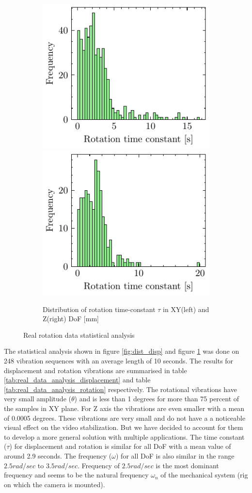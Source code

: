 \begin{figure}[H]
    \begin{subfigure}{\linewidth}
    \includegraphics[width=.5\linewidth]{images/fig_chapter4/data_dist/11.pdf}\hfill
    \includegraphics[width=.5\linewidth]{images/fig_chapter4/data_dist/12.pdf}
    \caption{Distribution of rotation time-constant $ \tau $ in XY(left) and Z(right) DoF [mm]}
    \end{subfigure}

\caption{Real rotation data statistical analysis}
\label{fig:dist_rot}
\end{figure}


The statistical analysis shown in figure \ref{fig:dist_disp} and figure \ref{fig:dist_rot} was done on 248 vibration sequences with an average length of 10 seconds. The results for displacement and rotation vibrations are summarised in table \ref{tab:real_data_analysis_displacement} and table \ref{tab:real_data_analysis_rotation} respectively. The rotational vibrations have very small amplitude ($ \theta $) and is less than 1 degrees for more than 75 percent of the samples in XY plane. For Z axis the vibrations are even smaller with a mean of 0.0005 degrees. These vibrations are very small and do not have a a noticeable visual effect on the video stabilization. But we have decided to account for them to develop a more general solution with multiple applications. The time constant ($ \tau $) for displacement and rotation is similar for all DoF with a mean value of around 2.9 seconds.  The frequency ($ \omega $) for all DoF is also similar in the range $ 2.5 rad/sec $ to $ 3.5 rad/sec $. Frequency of $ 2.5 rad/sec $ is the most dominant frequency and seems to be the natural frequency $ \omega_n $ of the mechanical system (rig on which the camera is mounted).


